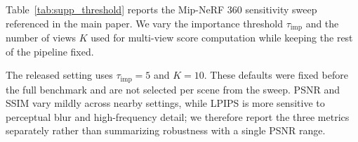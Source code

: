 \documentclass[sigconf]{acmart}
\begin{document}
Table~\ref{tab:supp_threshold} reports the Mip-NeRF 360 sensitivity sweep referenced in the main paper. We vary the importance threshold $\tau_{\text{imp}}$ and the number of views $K$ used for multi-view score computation while keeping the rest of the pipeline fixed.

The released setting uses $\tau_{\text{imp}}{=}5$ and $K{=}10$. These defaults were fixed before the full benchmark and are not selected per scene from the sweep. PSNR and SSIM vary mildly across nearby settings, while LPIPS is more sensitive to perceptual blur and high-frequency detail; we therefore report the three metrics separately rather than summarizing robustness with a single PSNR range.

\begin{table}[t]
    \centering
    \footnotesize
    \setlength\tabcolsep{4pt}
    \caption{
        \textbf{Threshold-sensitivity sweep on Mip-NeRF 360.}
        We vary the importance threshold $\tau_{\text{imp}}$ and the number of scoring views $K$. The selected full-model configuration is marked as \emph{default}.
    }
    \label{tab:supp_threshold}
\end{table}

\end{document}
